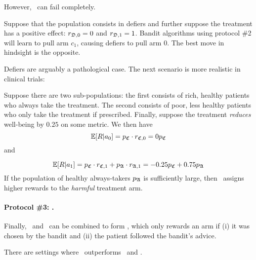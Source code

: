 However, \actual\, can fail completely.
\begin{eg}\label{eg:defiers}\eod
	Suppose that the population consists in defiers and further suppose the treatment has a positive effect: $r_{{\mathfrak D},0}=0$ and $r_{{\mathfrak D},1}=1$.
	Bandit algorithms using protocol \#2 will learn to pull arm $c_1$, causing defiers to pull arm $0$. The best move in hindsight is the opposite.
\end{eg}
Defiers are arguably a pathological case. The next scenario is more realistic in clinical trials:
\begin{eg}\label{eg:rich}\eod
	Suppose there are two sub-populations: the first consists of rich, healthy patients who always take the treatment. The second consists of poor, less healthy patients who only take the treatment if prescribed. Finally, suppose the treatment \emph{reduces} well-being by $0.25$ on some metric. We then have
	\begin{equation}
	    \operatorname*{\mathbb E}[R|a_0] = p_{\mathfrak C} \cdot r_{{\mathfrak C},0} = 0p_{\mathfrak C} 
	\end{equation} and 
	
	\begin{equation}
	    \operatorname*{\mathbb E}[R|a_1] = p_{\mathfrak C} \cdot r_{{\mathfrak C},1} + p_{\mathfrak A}\cdot r_{{\mathfrak A},1}
	    = -0.25p_{\mathfrak C} + 0.75p_{\mathfrak A}
	\end{equation}
	If the population of healthy always-takers $p_{\mathfrak A}$ is sufficiently large, then \actual\, assigns higher rewards to the \emph{harmful} treatment arm.
\end{eg}


\paragraph{Protocol \#3: \comply.}
Finally, \chosen\, and \actual\, can be combined to form \comply, which only rewards an arm if (i) it was chosen by the bandit and (ii) the patient followed the bandit's advice.

\begin{prop}\label{prop:comply}
	There are settings where \comply\, outperforms \chosen\, and \actual.
\end{prop}

